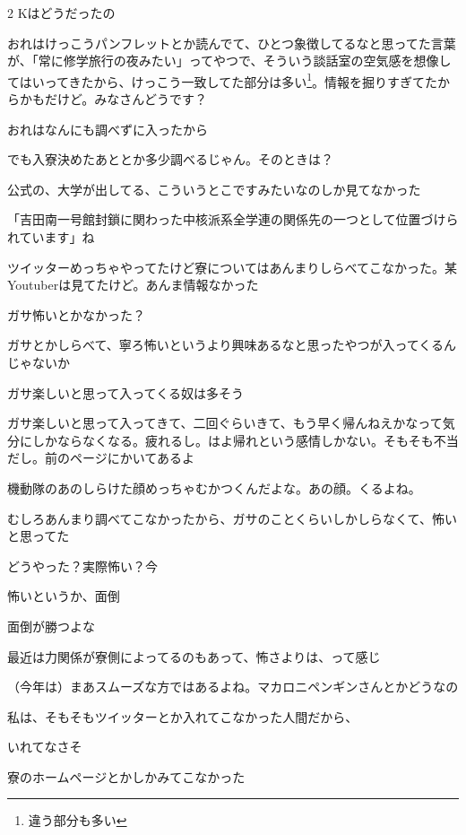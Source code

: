\begin{multicols}{2}
 Kはどうだったの

 おれはけっこうパンフレットとか読んでて、ひとつ象徴してるなと思ってた言葉が、「常に修学旅行の夜みたい」ってやつで、そういう談話室の空気感を想像してはいってきたから、けっこう一致してた部分は多い\footnote{違う部分も多い}。情報を掘りすぎてたからかもだけど。みなさんどうです？

 おれはなんにも調べずに入ったから

 でも入寮決めたあととか多少調べるじゃん。そのときは？

 公式の、大学が出してる、こういうとこですみたいなのしか見てなかった

 「吉田南一号館封鎖に関わった中核派系全学連の関係先の一つとして位置づけられています」ね

 ツイッターめっちゃやってたけど寮についてはあんまりしらべてこなかった。某Youtuberは見てたけど。あんま情報なかった

 ガサ怖いとかなかった？

 ガサとかしらべて、寧ろ怖いというより興味あるなと思ったやつが入ってくるんじゃないか

 ガサ楽しいと思って入ってくる奴は多そう

 ガサ楽しいと思って入ってきて、二回ぐらいきて、もう早く帰んねえかなって気分にしかならなくなる。疲れるし。はよ帰れという感情しかない。そもそも不当だし。前のページにかいてあるよ

 機動隊のあのしらけた顔めっちゃむかつくんだよな。あの顔。くるよね。

 むしろあんまり調べてこなかったから、ガサのことくらいしかしらなくて、怖いと思ってた

 どうやった？実際怖い？今

 怖いというか、面倒

 面倒が勝つよな

 最近は力関係が寮側によってるのもあって、怖さよりは、って感じ

 （今年は）まあスムーズな方ではあるよね。マカロニペンギンさんとかどうなの

 私は、そもそもツイッターとか入れてこなかった人間だから、

 いれてなさそ

 寮のホームページとかしかみてこなかった


\end{multicols}
